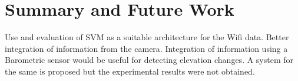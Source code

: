 \chapter{Summary and Future Work}
Use and evaluation of SVM as a suitable architecture for the Wifi data.
Better integration of information from the camera.
Integration of information using a Barometric sensor would be useful for detecting elevation changes. A system for the same is proposed but the experimental results were not obtained. 

